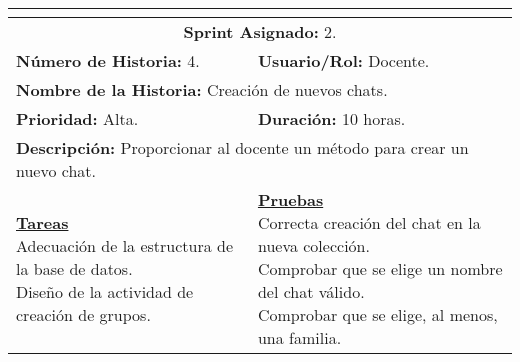 \resizebox{15cm}{!} {
	\begin{tabular}{|l|l|}
		\hline
		\multicolumn{2}{|c|}{\cellcolor[HTML]{343434}{\color[HTML]{FFFFFF} \textbf{Historia de Usuario}}} \\
		\hline
		\multicolumn{2}{|c|}{\textbf{Sprint Asignado:} 2.} \\
		\hline
		\textbf{Número de Historia:} 4. & \textbf{Usuario/Rol:} Docente.\\
		\hline
		\multicolumn{2}{|l|}{\textbf{Nombre de la Historia:} Creación de nuevos chats.} \\
		\hline
		\textbf{Prioridad:} Alta. & \textbf{Duración:} 10 horas.\\
		\hline
		\multicolumn{2}{|l|}{\textbf{Descripción:} Proporcionar al docente un método para crear un nuevo chat.} \\
		\hline
		\specialcell{\underline{\textbf{Tareas}} \\ Adecuación de la estructura de la base de datos. \\ Diseño de la actividad de creación de grupos.} & \specialcell{\underline{\textbf{Pruebas}} \\ Correcta creación del chat en la nueva colección. \\ Comprobar que se elige un nombre del chat válido. \\ Comprobar que se elige, al menos, una familia.} \\
		\hline
	\end{tabular}
}

